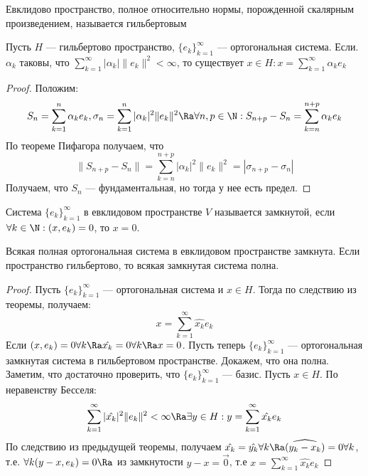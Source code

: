 \begin{definition}
    Евклидово пространство, полное относительно нормы, порожденной скалярным произведением, называется гильбертовым
\end{definition}

\begin{theorem}
    Пусть \(H\) --- гильбертово пространство, \(\{e_k\}_{k = 1}^\infty\) --- ортогональная система. Если. \(\alpha_k\) таковы, что \(\sum_{k = 1}^\infty |\alpha_k|\|e_k\|^2 < \infty\), то существует \(x \in H: x = \sum_{k = 1}^{\infty} \alpha_ke_k\)
\end{theorem}
\begin{proof}
    Положим:
    \[S_n = \sum_{k = 1}^n \alpha_k e_k, \sigma_n = \sum_{k = 1}^n |\alpha_k|^2 \|e_k\|^2 \Ra \forall n, p \in \N: S_{n + p} - S_n =  \sum_{k = n}^{n + p} \alpha_k e_k\]
    По теореме Пифагора получаем, что
    \[\|S_{n + p} - S_n\| = \sum_{k = n}^{n + p} |\alpha_k|^2 \|e_k\|^2 = |\sigma_{n + p} - \sigma_n|\]
    Получаем, что \(S_n\) --- фундаментальная, но тогда у нее есть предел.
\end{proof}

\begin{definition}
    Система \(\{e_k\}_{k = 1}^\infty\) в евклидовом пространстве \(V\) называется замкнутой, если \(\forall k \in \N: (x, e_k) = 0\), то \(x = 0\).
\end{definition}

\begin{theorem}
    Всякая полная ортогональная система в евклидовом пространстве замкнута. Если пространство гильбертово, то всякая замкнутая система полна.
\end{theorem}
\begin{proof}
    Пусть \(\{e_k\}_{k = 1}^\infty\) --- ортогональная система и \(x \in H\). Тогда по следствию из теоремы, получаем:
    \[x = \sum_{k = 1}^\infty \hat{x_k}e_k\]
    Если \((x, e_k) = 0 \forall k \Ra \hat{x_k} = 0 \forall k \Ra x = 0\). Пусть теперь \(\{e_k\}_{k = 1}^\infty\) --- ортогональная замкнутая система в гильбертовом пространстве. Докажем, что она полна. Заметим, что достаточно проверить, что \(\{e_k\}_{k = 1}^\infty\) --- базис. Пусть \(x \in H\). По неравенству Бесселя:
    \[\sum_{k = 1}^\infty |\hat{x_k}|^2\|e_k\|^2 < \infty \Ra \exists y \in H: y = \sum_{k = 1}^\infty \hat{x_k}e_k\]
    По следствию из предыдущей теоремы, получаем \(\hat{x_k} = \hat{y_k} \forall k \Ra \widehat{(y_k - x_k)} = 0 \forall k\), т.е. \(\forall k (y - x, e_k) = 0 \Ra\) из замкнутости \(y - x = \vec{0}\), т.е \(x = \sum_{k = 1}^\infty \hat{x_k}e_k\)
\end{proof}

